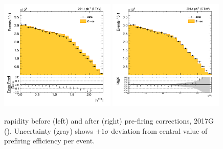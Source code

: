 \begin{figure}[htb]
\centering
\includegraphics[width=0.49\textwidth]{plots/Prefire/Zee5_Zrap_noPrefire.png}
\includegraphics[width=0.49\textwidth]{plots/Prefire/Zee5_Zrap_inclPrefire.png}
\caption{\zee rapidity before (left) and after (right) pre-firing corrections, 2017G (\sg). Uncertainty (gray) shows $\pm 1 \sigma$ deviation from central value of prefiring efficiency per event.}
\label{fig:prefire:zrap:2017G}
\end{figure}

